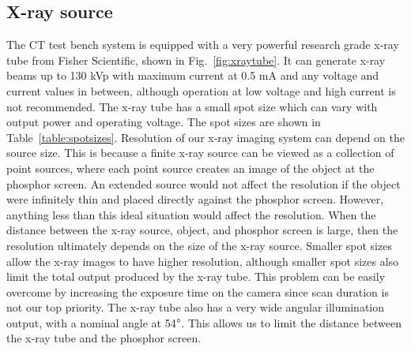 \subsection{X-ray source}
The CT test bench system is equipped with a very powerful research grade x-ray tube from Fisher Scientific, shown in Fig.~\ref{fig:xraytube}.  It can generate x-ray beams up to 130 kVp with maximum current at 0.5 mA and any voltage and current values in between, although operation at low voltage and high current is not recommended.  The x-ray tube has a small spot size which can vary with output power and operating voltage.  The spot sizes are shown in Table~\ref{table:spotsizes}.  Resolution of our x-ray imaging system can depend on the source size.  This is because a finite x-ray source can be viewed as a collection of point sources, where each point source creates an image of the object at the phosphor screen.  An extended source would not affect the resolution if the object were infinitely thin and placed directly against the phosphor screen.  However, anything less than this ideal situation would affect the resolution.  When the distance between the x-ray source, object, and phosphor screen is large, then the resolution ultimately depends on the size of the x-ray source.  Smaller spot sizes allow the x-ray images to have higher resolution, although smaller spot sizes also limit the total output produced by the x-ray tube.  This problem can be easily overcome by increasing the exposure time on the camera since scan duration is not our top priority.  The x-ray tube also has a very wide angular illumination output, with a nominal angle at 54$\degree$.  This allows us to limit the distance between the x-ray tube and the phosphor screen.
%
\begin{figure}
\begin{floatrow}
\end{floatrow}
\end{figure}

